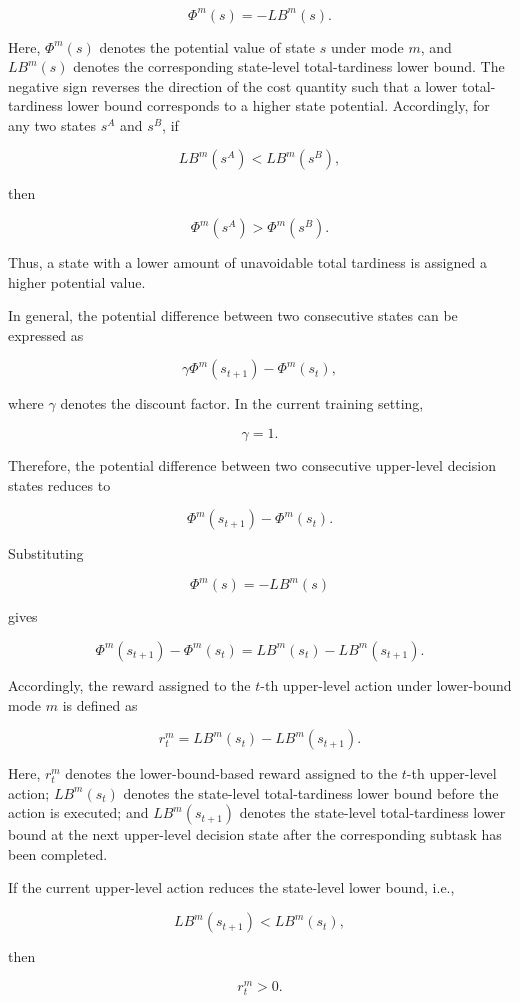 \[
\Phi^m(s)
=
-LB^m(s).
\]

Here, \(\Phi^m(s)\) denotes the potential value of state \(s\) under mode \(m\),
and \(LB^m(s)\) denotes the corresponding state-level total-tardiness lower
bound. The negative sign reverses the direction of the cost quantity such that
a lower total-tardiness lower bound corresponds to a higher state potential.
Accordingly, for any two states \(s^A\) and \(s^B\), if

\[
LB^m(s^A)
<
LB^m(s^B),
\]

then

\[
\Phi^m(s^A)
>
\Phi^m(s^B).
\]

Thus, a state with a lower amount of unavoidable total tardiness is assigned a
higher potential value.

In general, the potential difference between two consecutive states can be
expressed as

\[
\gamma
\Phi^m(s_{t+1})
-
\Phi^m(s_t),
\]

where \(\gamma\) denotes the discount factor. In the current training setting,

\[
\gamma=1.
\]

Therefore, the potential difference between two consecutive upper-level
decision states reduces to

\[
\Phi^m(s_{t+1})
-
\Phi^m(s_t).
\]

Substituting

\[
\Phi^m(s)
=
-LB^m(s)
\]

gives

\[
\Phi^m(s_{t+1})
-
\Phi^m(s_t)
=
LB^m(s_t)
-
LB^m(s_{t+1}).
\]

Accordingly, the reward assigned to the \(t\)-th upper-level action under
lower-bound mode \(m\) is defined as

\[
r_t^m
=
LB^m(s_t)
-
LB^m(s_{t+1}).
\]

Here, \(r_t^m\) denotes the lower-bound-based reward assigned to the
\(t\)-th upper-level action; \(LB^m(s_t)\) denotes the state-level
total-tardiness lower bound before the action is executed; and
\(LB^m(s_{t+1})\) denotes the state-level total-tardiness lower bound at the
next upper-level decision state after the corresponding subtask has been
completed.

If the current upper-level action reduces the state-level lower bound, i.e.,

\[
LB^m(s_{t+1})
<
LB^m(s_t),
\]

then

\[
r_t^m>0.
\]

